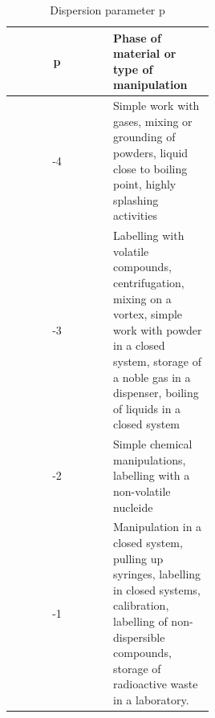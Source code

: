 \begin{table}
    \centering
\caption{Dispersion parameter p}
\label{tab:placeholder}
    \begin{tabular}{c>{\raggedright\arraybackslash}p{0.5\linewidth}}\toprule
         p& Phase of material or type of manipulation\\\midrule
         -4& Simple work with gases, mixing or grounding of powders, liquid close to boiling point, highly splashing activities\\
         -3& Labelling with volatile compounds, centrifugation, mixing on a vortex, simple work with powder in a closed system, storage of a noble gas in a dispenser, boiling of liquids in a closed system\\
         -2& Simple chemical manipulations, labelling with a non-volatile nucleide\\
         -1& Manipulation in a closed system, pulling up syringes, labelling in closed systems, calibration, labelling of non-dispersible compounds, storage of radioactive waste in a laboratory.\\ \bottomrule
    \end{tabular}
    
    
\end{table}

